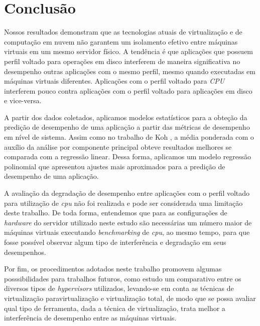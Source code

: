 \section{Conclusão}
\label{sec:conclusao}

Nossos resultados demonstram que as tecnologias atuais de virtualização e de
computação em nuvem não garantem um isolamento efetivo entre máquinas virtuais
em um mesmo servidor físico. A tendência é que aplicações que possuem perfil
voltado para operações em disco interferem de maneira significativa no
desempenho outras aplicações  com o mesmo perfil, mesmo quando executadas em
máquinas virtuais diferentes. Aplicações com o perfil voltado para \textit{CPU}
interferem pouco contra aplicações com o perfil voltado para aplicações em
disco e vice-versa.

A partir dos dados coletados, aplicamos modelos estatísticos para a obteção da
predição de desempenho de uma aplicação a partir das métricas de desempenho em
nível de sistema. Assim como no trabalho de Koh \cite{koh2007}, a média
ponderada com o auxílio da análise por componente principal obteve resultados
melhores se comparada com a regressão linear. Dessa forma, aplicamos um modelo
regressão polinomial que apresentou ajustes mais aproximados para a predição de
desempenho de uma aplicação.

A avaliação da degradação de desempenho entre aplicações com o perfil voltado
para utilização de \textit{cpu} não foi realizada e pode ser considerada uma
limitação deste trabalho. De toda forma, entendemos que para as configurações
de \textit{hardware} do servidor utilizado neste estudo são necessárias um
número maior de máquinas virtuais executando \textit{benchmarking} de
\textit{cpu}, ao mesmo tempo, para que fosse possível observar algum tipo de
interferência e degradação em seus desempenhos.

Por fim, os procedimentos adotados neste trabalho promovem algumas
posssibilidades para trabalhos futuros, como estudo um comparativo entre os
diversos tipos de \textit{hypervisors} utilizados, levando-se em conta as
técnicas de virtualização paravirtualização e virtualização total, de modo que
se possa avaliar qual tipo de ferramenta, dada a técnica de virtualização,
trata melhor a interferência de desempenho entre as máquinas virtuais.

